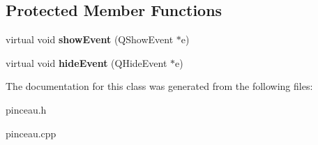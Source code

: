 \subsection*{\-Protected \-Member \-Functions}
\begin{DoxyCompactItemize}
\item 
\hypertarget{class_pinceau_aa63cf90592ec14697f1a4a24634e4cb7}{virtual void {\bfseries show\-Event} (\-Q\-Show\-Event $\ast$e)}\label{class_pinceau_aa63cf90592ec14697f1a4a24634e4cb7}

\item 
\hypertarget{class_pinceau_a9306bed2873e43b271809f58b5ebffe7}{virtual void {\bfseries hide\-Event} (\-Q\-Hide\-Event $\ast$e)}\label{class_pinceau_a9306bed2873e43b271809f58b5ebffe7}

\end{DoxyCompactItemize}


\-The documentation for this class was generated from the following files\-:\begin{DoxyCompactItemize}
\item 
pinceau.\-h\item 
pinceau.\-cpp\end{DoxyCompactItemize}
